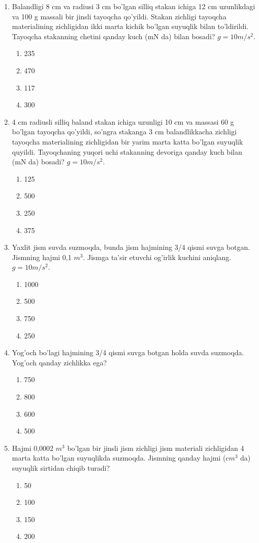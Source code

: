 \begin{enumerate}
\item Balandligi 8 cm va radiusi 3 cm bo'lgan silliq stakan ichiga 12 cm uzunlikdagi va 100 g massali bir jinsli tayoqcha qo'yildi. Stakan zichligi tayoqcha materialining zichligidan ikki marta kichik bo'lgan suyuqlik bilan to'ldirildi. Tayoqcha stakanning chetini qanday kuch (mN da) bilan bosadi? $g=10m/s^2$.
\begin{enumerate}[label=\Alph*)]
\item 235
\item 470
\item 117
\item 300
\end{enumerate}

\item 4 cm radiusli silliq baland stakan ichiga uzunligi 10 cm va massasi 60 g bo'lgan tayoqcha qo'yildi, so'ngra stakanga 3 cm balandlikkacha zichligi tayoqcha materialining zichligidan bir yarim marta katta bo'lgan suyuqlik quyildi. Tayoqchaning yuqori uchi stakanning devoriga qanday kuch bilan (mN da) bosadi? $g=10m/s^2$.
\begin{enumerate}[label=\Alph*)]
\item 125
\item 500
\item 250
\item 375
\end{enumerate}

\item Yaxlit jism suvda suzmoqda, bunda jism hajmining 3/4 qismi suvga botgan. Jismning hajmi 0,1 $m^3$. Jismga ta'sir etuvchi og'irlik kuchini aniqlang. $g=10m/s^2$.
\begin{enumerate}[label=\Alph*)]
\item 1000
\item 500
\item 750
\item 250
\end{enumerate}

\item Yog'och bo'lagi hajmining 3/4 qismi suvga botgan holda suvda suzmoqda. Yog'och qanday zichlikka ega?
\begin{enumerate}[label=\Alph*)]
\item 750
\item 800
\item 600
\item 500
\end{enumerate}

\item Hajmi 0,0002 $m^3$ bo'lgan bir jinsli jism zichligi jism materiali zichligidan 4 marta katta bo'lgan suyuqlikda suzmoqda. Jismning qanday hajmi ($cm^3$ da) suyuqlik sirtidan chiqib turadi?
\begin{enumerate}[label=\Alph*)]
\item 50
\item 100
\item 150
\item 200
\end{enumerate}


\end{enumerate}
